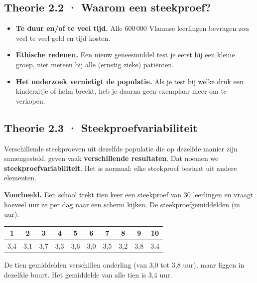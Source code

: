 \subsection*{Theorie 2.2 · Waarom een steekproef?}

\begin{theorie}
\begin{itemize}
\item \textbf{Te duur en/of te veel tijd.} Alle 600\,000 Vlaamse leerlingen bevragen zou veel te veel geld en tijd kosten.
\item \textbf{Ethische redenen.} Een nieuw geneesmiddel test je eerst bij een kleine groep, niet meteen bij alle (ernstig zieke) patiënten.
\item \textbf{Het onderzoek vernietigt de populatie.} Als je test bij welke druk een kinderzitje of helm breekt, heb je daarna geen exemplaar meer om te verkopen.
\end{itemize}
\end{theorie}

\subsection*{Theorie 2.3 · Steekproefvariabiliteit}

\begin{theorie}
Verschillende steekproeven uit dezelfde populatie die op dezelfde manier zijn samengesteld, geven vaak \textbf{verschillende resultaten}. Dat noemen we \textbf{steekproefvariabiliteit}. Het is normaal: elke steekproef bestaat uit andere elementen.
\end{theorie}

\begin{voorbeeld}
\textbf{Voorbeeld.} Een school trekt tien keer een steekproef van 30 leerlingen en vraagt hoeveel uur ze per dag naar een scherm kijken. De steekproefgemiddelden (in uur):

\begin{tabular}{cccccccccc}
\hline
1 & 2 & 3 & 4 & 5 & 6 & 7 & 8 & 9 & 10 \\
\hline
3,4 & 3,1 & 3,7 & 3,3 & 3,6 & 3,0 & 3,5 & 3,2 & 3,8 & 3,4 \\
\hline
\end{tabular}

De tien gemiddelden verschillen onderling (van 3,0 tot 3,8 uur), maar liggen in dezelfde buurt. Het gemiddelde van alle tien is 3,4 uur.
\end{voorbeeld}

